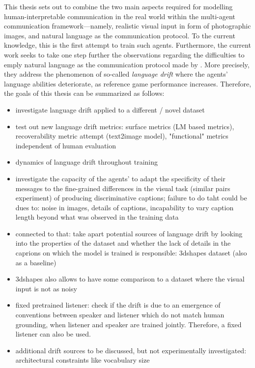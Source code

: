 This thesis sets out to combine the two main aspects required for modelling human-interpretable communication in the real world within the multi-agent communication framework---namely, realistic visual input in form of photographic images, and natural language as the communication protocol. To the current knowledge, this is the first attempt to train such agents. 
Furthermore, the current work seeks to take one step further the observations regarding the difficulties to emply natural language as the communication protocol made by \parencite{lazaridou2020multi}. More precisely, they address the phenomenon of so-called \textit{language drift} where the agents' language abilities deteriorate, as reference game performance increases. Therefore, the goals of this thesis can be summarized as follows: 
\begin{itemize}
	\item investigate language drift applied to a different / novel dataset
	\item test out new language drift metrics: surface metrics (LM based metrics), recoverability metric attempt (text2image model), "functional" metrics independent of human evaluation
	\item dynamics of language drift throughout training
	\item investigate the capacity of the agents' to adapt the specificity of their messages to the fine-grained differences in the visual task (similar pairs experiment) of producing discriminative captions; failure to do taht could be dues to: noise in images, details of captions, incapability to vary caption length beyond what was observed in the training data
	\item connected to that: take apart potential sources of language drift by looking into the properties of the dataset and whether the lack of details in the caprions on which the model is trained is responsible: 3dshapes dataset (also as a baseline) 
	\item 3dshapes also allows to have some comparison to a dataset where the visual input is not as noisy 
	\item fixed pretrained listener: check if the drift is due to an emergence of conventions between speaker and listener which do not match human grounding, when listener and speaker are trained jointly. Therefore, a fixed listener can also be used. 
	\item additional drift sources to be discussed, but not experimentally investigated: architectural constraints like vocabulary size
\end{itemize}

